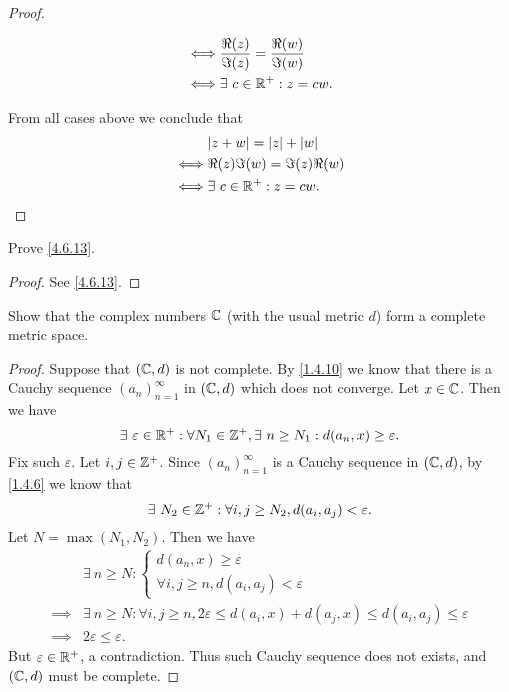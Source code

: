 \begin{proof}
\begin{itemize}
\begin{align*}
            \iff & \frac{\Re(z)}{\Im(z)} = \frac{\Re(w)}{\Im(w)} \\
            \iff & \exists\ c \in \mathbb{R}^+ : z = cw.
          \end{align*}
  \end{itemize}
  From all cases above we conclude that
  \begin{align*}
         & \abs{z + w} = \abs{z} + \abs{w} \\
    \iff & \Re(z) \Im(w) = \Im(z) \Re(w)   \\
    \iff & \exists\ c \in \R^+ : z = cw.
  \end{align*}
\end{proof}

\begin{ex}\label{ex:4.6.9}
  Prove \cref{4.6.13}.
\end{ex}

\begin{proof}
  See \cref{4.6.13}.
\end{proof}

\begin{ex}\label{ex:4.6.10}
  Show that the complex numbers \(\mathbb{C}\) (with the usual metric \(d\)) form a complete metric space.
\end{ex}

\begin{proof}
  Suppose that \((\mathbb{C}, d)\) is not complete.
  By \cref{1.4.10} we know that there is a Cauchy sequence \((a_n)_{n = 1}^\infty\) in \((\mathbb{C}, d)\) which does not converge.
  Let \(x \in \mathbb{C}\).
  Then we have
  \[
    \exists\ \varepsilon \in \mathbb{R}^+ : \forall N_1 \in \mathbb{Z}^+, \exists\ n \geq N_1 : d(a_n, x) \geq \varepsilon.
  \]
  Fix such \(\varepsilon\).
  Let \(i, j \in \mathbb{Z}^+\).
  Since \((a_n)_{n = 1}^\infty\) is a Cauchy sequence in \((\mathbb{C}, d)\), by \cref{1.4.6} we know that
  \[
    \exists\ N_2 \in \mathbb{Z}^+ : \forall i, j \geq N_2, d(a_i, a_j) < \varepsilon.
  \]
  Let \(N = \max(N_1, N_2)\).
  Then we have
  \begin{align*}
             & \exists\ n \geq N : \begin{cases}
                                     d(a_n, x) \geq \varepsilon \\
                                     \forall i, j \geq n, d(a_i, a_j) < \varepsilon
                                   \end{cases}                                                  \\
    \implies & \exists\ n \geq N : \forall i, j \geq n, 2\varepsilon \leq d(a_i, x) + d(a_j, x) \leq d(a_i, a_j) \leq \varepsilon \\
    \implies & 2\varepsilon \leq \varepsilon.
  \end{align*}
  But \(\varepsilon \in \mathbb{R}^+\), a contradiction.
  Thus such Cauchy sequence does not exists, and \((\mathbb{C}, d)\) must be complete.
\end{proof}

